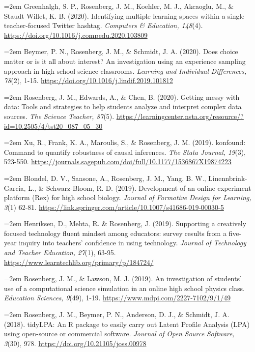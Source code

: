 \documentclass[
  11pt,
]{article}
\begin{document}
\hangindent=2em Greenhalgh, S. P., Rosenberg, J. M., Koehler, M. J.,
Akcaoglu, M., \& Staudt Willet, K. B. (2020). Identifying multiple
learning spaces within a single teacher-focused Twitter hashtag.
\emph{Computers \& Education, 148}(4).
\url{https://doi.org/10.1016/j.compedu.2020.103809}

\hangindent=2em Beymer, P. N., Rosenberg, J. M., \& Schmidt, J. A.
(2020). Does choice matter or is it all about interest? An investigation
using an experience sampling approach in high school science classrooms.
\emph{Learning and Individual Differences, 78}(2), 1-15.
\url{https://doi.org/10.1016/j.lindif.2019.101812}

\hangindent=2em Rosenberg, J. M., Edwards, A., \& Chen, B. (2020).
Getting messy with data: Tools and strategies to help students analyze
and interpret complex data sources. \emph{The Science Teacher, 87}(5).
\url{https://learningcenter.nsta.org/resource/?id=10.2505/4/tst20_087_05_30}

\hangindent=2em Xu, R., Frank, K. A., Maroulis, S., \& Rosenberg, J. M.
(2019). konfound: Command to quantify robustness of causal inferences.
\emph{The Stata Journal, 19}(3), 523-550.
\url{https://journals.sagepub.com/doi/full/10.1177/1536867X19874223}

\hangindent=2em Blondel, D. V., Sansone, A., Rosenberg, J. M., Yang, B.
W., Linennbrink-Garcia, L., \& Schwarz-Bloom, R. D. (2019). Development
of an online experiment platform (Rex) for high school biology.
\emph{Journal of Formative Design for Learning, 3}(1) 62-81.
\url{https://link.springer.com/article/10.1007/s41686-019-00030-5}

\hangindent=2em Henriksen, D., Mehta, R. \& Rosenberg, J. (2019).
Supporting a creatively focused technology fluent mindset among
educators: survey results from a five-year inquiry into teachers'
confidence in using technology. \emph{Journal of Technology and Teacher
Education, 27}(1), 63-95.
\url{https://www.learntechlib.org/primary/p/184724/}

\hangindent=2em Rosenberg, J. M., \& Lawson, M. J. (2019). An
investigation of students' use of a computational science simulation in
an online high school physics class. \emph{Education Sciences, 9}(49),
1-19. \url{https://www.mdpi.com/2227-7102/9/1/49}

\hangindent=2em Rosenberg, J. M., Beymer, P. N., Anderson, D. J., \&
Schmidt, J. A. (2018). tidyLPA: An R package to easily carry out Latent
Profile Analysis (LPA) using open-source or commercial software.
\emph{Journal of Open Source Software, 3}(30), 978.
\url{https://doi.org/10.21105/joss.00978}
\end{document}
